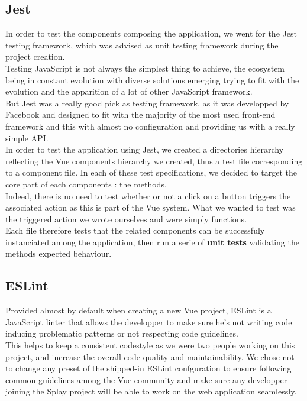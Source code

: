 \documentclass{eplmastersthesis}
\begin{document}
      \subsection{Jest}

        In order to test the components composing the application, we
        went for the Jest \cite{jest} testing framework, which was advised
        as unit testing framework during the project creation.\\

        Testing JavaScript is not always the simplest thing to achieve, the
        ecosystem being in constant evolution with diverse solutions emerging
        trying to fit with the evolution and the apparition of a lot of
        other JavaScript framework.\\
        But Jest was a really good pick as testing framework, as it was
        developped by Facebook and designed to fit with the majority of the
        most used front-end framework and this with almost no configuration and
        providing us with a really simple API.\\

        In order to test the application using Jest, we created a directories
        hierarchy reflecting the Vue components hierarchy we created, thus
        a test file corresponding to a component file. In each of these
        test specifications, we decided to target the core part of each
        components : the methods.\\
        Indeed, there is no need to test whether or not a click on a button
        triggers the associated action as this is part of the Vue system. What
        we wanted to test was the triggered action we wrote ourselves and
        were simply functions.\\
        Each file therefore tests that the related components can be
        successfuly instanciated among the application, then run a serie
        of \textbf{unit tests} validating the methods expected behaviour.

      \subsection{ESLint}

        Provided almost by default when creating a new Vue project, ESLint
        \cite{eslint} is a JavaScript linter that allows the developper to
        make sure he's not writing code inducing problematic patterns or not
        respecting code guidelines.\\
        This helps to keep a consistent codestyle as we were two people working
        on this project, and increase the overall code quality and
        maintainability. We chose not to change any preset of the shipped-in
        ESLint confguration to ensure following common guidelines among the Vue
        community and make sure any developper joining the Splay project will
        be able to work on the web application seamlessly.
\end{document}
